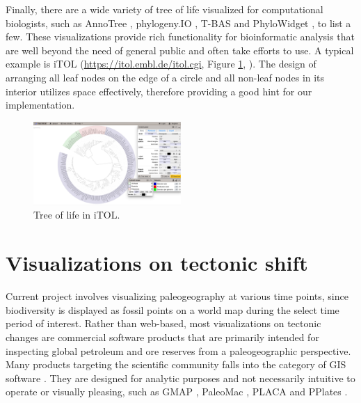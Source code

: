 \documentclass[11pt, a4paper,oneside,chapterprefix=false]{scrbook}
\begin{document}
Finally, there are a wide variety of tree of life visualized for computational biologists, such as AnnoTree \cite{mendler2019annotree}, phylogeny.IO \cite{jovanovic2019interactive}, T-BAS \cite{carbone2017t} and PhyloWidget \cite{jordan2008phylowidget}, to list a few. These visualizations provide rich functionality for bioinformatic analysis that are well beyond the need of general public and often take efforts to use. A typical example is iTOL (\url{https://itol.embl.de/itol.cgi}, Figure \ref{fig:iTOL}, \cite{letunic2019interactive}). The design of arranging all leaf nodes on the edge of a circle and all non-leaf  nodes in its interior utilizes space effectively, therefore providing a good hint for our implementation.\\

\begin{figure}[h]
	\centering
	\includegraphics[width=0.5\textwidth]{figures/related_work/iTOL}
	\caption{Tree of life in iTOL. }
	\label{fig:iTOL}
\end{figure}

\newpage

\section{Visualizations on tectonic shift}
Current project involves visualizing paleogeography at various time points, since biodiversity is displayed as fossil points on a world map during the select time period of interest. Rather than web-based, most visualizations on tectonic changes are commercial software products that are primarily intended for inspecting global petroleum and ore reserves from a paleogeographic perspective.  Many products targeting the scientific community falls into the category of GIS software \cite{steiniger2010gis}. They are  designed for analytic purposes and not necessarily intuitive to operate or visually pleasing, such as GMAP \cite{torsvik1999plate}, PaleoMac \cite{cogne2003paleomac}, PLACA \cite{matias2005placa} and PPlates \cite{smith2007re}. \\
\end{document}
